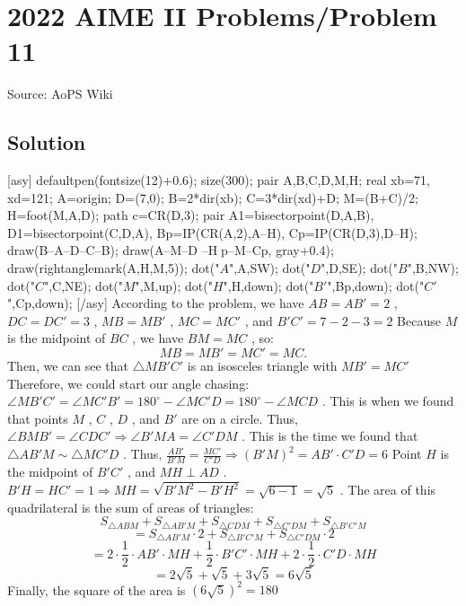 \documentclass[12pt]{article}
\begin{document}
\section*{{2022 AIME II Problems/Problem 11}}
Source: AoPS Wiki

\subsection*{Solution}
[asy] defaultpen(fontsize(12)+0.6); size(300); pair A,B,C,D,M,H; real xb=71, xd=121; A=origin; D=(7,0); B=2*dir(xb); C=3*dir(xd)+D; M=(B+C)/2; H=foot(M,A,D); path c=CR(D,3); pair A1=bisectorpoint(D,A,B), D1=bisectorpoint(C,D,A), Bp=IP(CR(A,2),A--H), Cp=IP(CR(D,3),D--H); draw(B--A--D--C--B); draw(A--M--D^^M--H^^Bp--M--Cp, gray+0.4); draw(rightanglemark(A,H,M,5)); dot("$A$",A,SW); dot("$D$",D,SE); dot("$B$",B,NW); dot("$C$",C,NE); dot("$M$",M,up); dot("$H$",H,down); dot("$B'$",Bp,down); dot("$C'$",Cp,down); [/asy] According to the problem, we have $AB=AB'=2$ , $DC=DC'=3$ , $MB=MB'$ , $MC=MC'$ , and $B'C'=7-2-3=2$ Because $M$ is the midpoint of $BC$ , we have $BM=MC$ , so: \[MB=MB'=MC'=MC.\] Then, we can see that $\bigtriangleup{MB'C'}$ is an isosceles triangle with $MB'=MC'$ Therefore, we could start our angle chasing: $\angle{MB'C'}=\angle{MC'B'}=180^\circ-\angle{MC'D}=180^\circ-\angle{MCD}$ . This is when we found that points $M$ , $C$ , $D$ , and $B'$ are on a circle. Thus, $\angle{BMB'}=\angle{CDC'} \Rightarrow \angle{B'MA}=\angle{C'DM}$ . This is the time we found that $\bigtriangleup{AB'M} \sim \bigtriangleup{MC'D}$ . Thus, $\frac{AB'}{B'M}=\frac{MC'}{C'D} \Longrightarrow (B'M)^2=AB' \cdot C'D = 6$ Point $H$ is the midpoint of $B'C'$ , and $MH \perp AD$ . $B'H=HC'=1 \Longrightarrow MH=\sqrt{B'M^2-B'H^2}=\sqrt{6-1}=\sqrt{5}$ . The area of this quadrilateral is the sum of areas of triangles: \[S_{\bigtriangleup{ABM}}+S_{\bigtriangleup{AB'M}}+S_{\bigtriangleup{CDM}}+S_{\bigtriangleup{C'DM}}+S_{\bigtriangleup{B'C'M}}\] \[=S_{\bigtriangleup{AB'M}}\cdot 2 + S_{\bigtriangleup{B'C'M}} + S_{\bigtriangleup{C'DM}}\cdot 2\] \[=2 \cdot \frac{1}{2} \cdot AB' \cdot MH + \frac{1}{2} \cdot B'C' \cdot MH + 2 \cdot \frac{1}{2} \cdot C'D \cdot MH\] \[=2\sqrt{5}+\sqrt{5}+3\sqrt{5}=6\sqrt{5}\] Finally, the square of the area is $(6\sqrt{5})^2=\boxed{180}$
\end{document}
